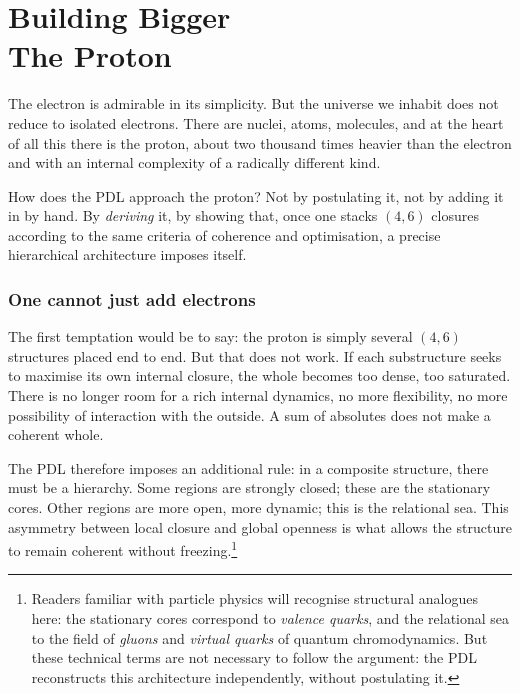 \documentclass[12pt, a4paper, openright]{book}
\begin{document}
\chapter[Building Bigger --- The Proton]{Building Bigger \\ The Proton}

The electron is admirable in its simplicity. But the universe we inhabit does not reduce to isolated electrons. There are nuclei, atoms, molecules, and at the heart of all this there is the proton, about two thousand times heavier than the electron and with an internal complexity of a radically different kind.

\medskip

How does the PDL approach the proton? Not by postulating it, not by adding it in by hand. By \emph{deriving} it, by showing that, once one stacks $(4,6)$ closures according to the same criteria of coherence and optimisation, a precise hierarchical architecture imposes itself.

\subsection*{One cannot just add electrons}

The first temptation would be to say: the proton is simply several $(4,6)$ structures placed end to end. But that does not work. If each substructure seeks to maximise its own internal closure, the whole becomes too dense, too saturated. There is no longer room for a rich internal dynamics, no more flexibility, no more possibility of interaction with the outside. A sum of absolutes does not make a coherent whole.

\medskip

The PDL therefore imposes an additional rule: in a composite structure, there must be a hierarchy. Some regions are strongly closed; these are the stationary cores. Other regions are more open, more dynamic; this is the relational sea. This asymmetry between local closure and global openness is what allows the structure to remain coherent without freezing.\footnote{Readers familiar with particle physics will recognise structural analogues here: the stationary cores correspond to \emph{valence quarks}, and the relational sea to the field of \emph{gluons} and \emph{virtual quarks} of quantum chromodynamics. But these technical terms are not necessary to follow the argument: the PDL reconstructs this architecture independently, without postulating it.}
\end{document}
